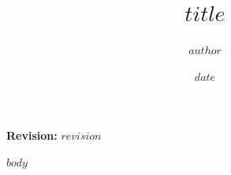 \documentclass[12pt]{article}
\title{$title$}
\author{$author$}
\date{$date$}
\begin{document}
\begin{titlepage}
\maketitle
\vspace{2cm}
\begin{center}
    \textbf{Revision:} $revision$
\end{center}
\end{titlepage}

\tableofcontents
\newpage

$body$
\end{document}
